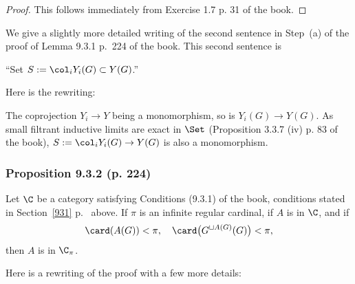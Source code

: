 \documentclass[12pt]{article}
\theoremstyle{remark}
\theoremstyle{definition}
\begin{document}
\begin{proof}
This follows immediately from Exercise 1.7 p. 31 of the book.
\end{proof}

We give a slightly more detailed writing of the second sentence in Step~(a) of the proof of Lemma 9.3.1 p.~224 of the book. This second sentence is 

``Set $S:=\col_iY_i(G)\subset Y(G)$.'' 

Here is the rewriting: 

The coprojection $Y_i\to Y$ being a monomorphism, so is $Y_i(G)\to Y(G)$. As small filtrant inductive limits are exact in $\Set$ (Proposition 3.3.7 (iv) p. 83 of the book), $S:=\col_iY_i(G)\to Y(G)$ is also a monomorphism.

%

\subsubsection{Proposition 9.3.2 (p. 224)}

\begin{prop}[Proposition 9.3.2 p.~224] 
Let $\C$ be a category satisfying Conditions (9.3.1) of the book, conditions stated in Section~\ref{931} p.~ above. If $\pi$ is an infinite regular cardinal, if $A$ is in $\C$, and if 
$$
\card(A(G))<\pi,\quad\card\big(G^{\sqcup A(G)}(G)\big)<\pi,
$$ 
then $A$ is in $\C_\pi$.
\end{prop}

Here is a rewriting of the proof with a few more details:
\end{document}

